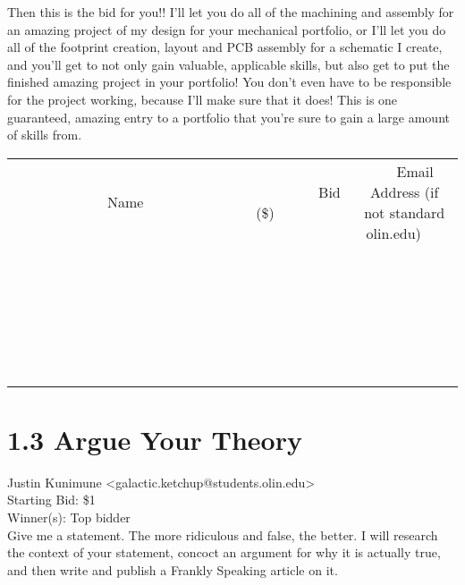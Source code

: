 \documentclass[11pt]{article}
\begin{document}
Then this is the bid for you!! I'll let you do all of the machining and assembly for an amazing project of my design for your mechanical portfolio, or I'll let you do all of the footprint creation, layout and PCB assembly for a schematic I create, and you'll get to not only gain valuable, applicable skills, but also get to put the finished amazing project in your portfolio! You don't even have to be responsible for the project working, because I'll make sure that it does! This is one guaranteed, amazing entry to a portfolio that you're sure to gain a large amount of skills from. \\
					[6ex]
					\begin{tabular}{c c c}
						~~~~~~~~~~~~~Name~~~~~~~~~~~~~ & ~~~~~~~~~Bid (\$)~~~~~~~~~ & ~~~Email Address (if not standard olin.edu)~~~ \\
				
 & & \\
\hline
 & & \\
\hline
 & & \\
\hline
 & & \\
\hline
 & & \\
\hline
 & & \\
\hline
 & & \\
\hline
 & & \\
\hline
 & & \\
\hline
 & & \\
\hline
 & & \\
\hline
 & & \\
\hline
 & & \\
\hline
 & & \\
\hline
 & & \\
\hline
 & & \\
\hline
 & & \\
\hline
 & & \\
\hline
 & & \\
\hline
 & & \\
\hline
 & & \\
\hline
 & & \\
\hline
 & & \\
\hline
 & & \\
\hline
 & & \\
\hline
 & & \\
\hline
					\end{tabular}
					\clearpage
				
					\section*{1.3 Argue Your Theory}
					Justin Kunimune <galactic.ketchup@students.olin.edu> \\
					Starting Bid: \$1 \\
					Winner(s): Top bidder \\
					Give me a statement. The more ridiculous and false, the better. I will research the context of your statement, concoct an argument for why it is actually true, and then write and publish a Frankly Speaking article on it.
\end{document}

